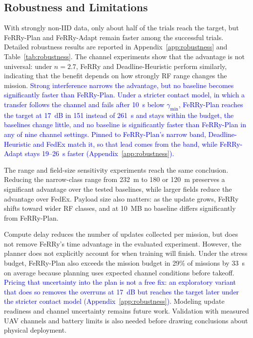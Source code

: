 \documentclass[conference]{IEEEtran}
\newcommand{\sysname}{FeRRy}
\begin{document}
\subsection{Robustness and Limitations}
\label{sec:robustness}
With strongly non-IID data, only about half of the trials reach the target, but
\sysname{}-Plan and \sysname{}-Adapt remain faster among the successful trials. Detailed robustness results are reported in
Appendix~\ref{app:robustness} and Table~\ref{tab:robustness}.
The channel experiments show that the advantage is not universal: under
\(n=2.7\), \sysname{} and Deadline-Heuristic perform similarly, indicating
that the benefit depends on how strongly RF range changes the mission.
\textcolor{blue}{Strong interference narrows the advantage, but no baseline becomes
significantly faster than \sysname{}-Plan. Under a stricter contact model, in
which a transfer follows the channel and fails after 10~s below
$\gamma_{\min}$, \sysname{}-Plan reaches the target at 17~dB in 151 instead of
261~s and stays within the budget, the baselines change little, and no baseline
is significantly faster than \sysname{}-Plan in any of nine channel settings.
Pinned to \sysname{}-Plan's narrow band, Deadline-Heuristic and FedEx match it,
so that lead comes from the band, while \sysname{}-Adapt stays 19--26~s faster
(Appendix~\ref{app:robustness}).}

The range and field-size sensitivity experiments reach the same conclusion.
Reducing the narrow-class range from 232~m to 180 or 120~m preserves a
significant advantage over the tested baselines, while larger fields reduce the
advantage over FedEx. Payload size also matters: as the update grows,
\sysname{} shifts toward wider RF classes, and at 10~MB no baseline differs
significantly from \sysname{}-Plan.

Compute delay reduces the number of updates collected per mission, but does not
remove \sysname{}'s time advantage in the evaluated experiment. However, the
planner does not explicitly account for when training will finish. Under the
stress budget, \sysname{}-Plan also exceeds the mission budget in 29\% of
missions by 33~s on average because planning uses expected channel conditions
before takeoff. \textcolor{blue}{Pricing that uncertainty into the plan is not a
free fix: an exploratory variant that does so removes the overruns at 17~dB but
reaches the target later under the stricter contact model
(Appendix~\ref{app:robustness}).} Modeling update readiness and channel
uncertainty remains future work. Validation with measured UAV channels and
battery limits is also needed before drawing conclusions about physical
deployment.
\end{document}
